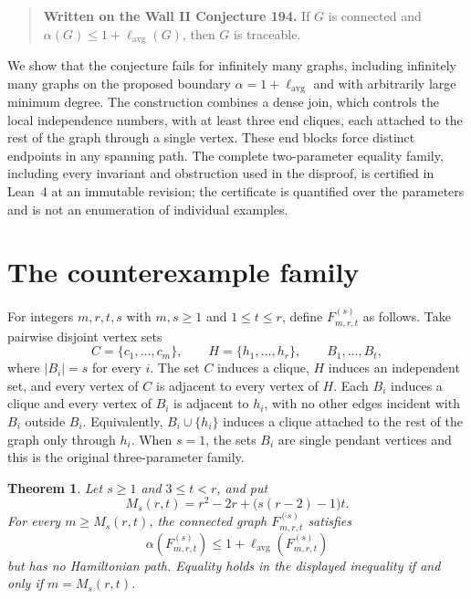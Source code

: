\documentclass[11pt]{article}
\newtheorem{theorem}{Theorem}
\newcommand{\lavg}{\ell_{\mathrm{avg}}}
\begin{document}
\begin{quote}
\textbf{Written on the Wall II Conjecture 194.}
If $G$ is connected and $\alpha(G)\leq 1+\lavg(G)$, then $G$ is traceable.
\end{quote}

We show that the conjecture fails for infinitely many graphs, including infinitely many
graphs on the proposed boundary $\alpha=1+\lavg$ and with arbitrarily large minimum degree.
The construction combines a dense join, which controls the local independence numbers, with
at least three end cliques, each attached to the rest of the graph through a single vertex.
These end blocks force distinct endpoints in any spanning path.  The complete two-parameter
equality family, including every invariant and obstruction used in the disproof, is certified
in Lean~4 at an immutable revision; the certificate is quantified over the parameters and is
not an enumeration of individual examples.

\section{The counterexample family}

For integers $m,r,t,s$ with $m,s\geq 1$ and $1\leq t\leq r$, define
$F^{(s)}_{m,r,t}$ as follows.  Take pairwise disjoint vertex sets
\[
  C=\{c_1,\dots,c_m\},\qquad
  H=\{h_1,\dots,h_r\},\qquad
  B_1,\dots,B_t,
\]
where $|B_i|=s$ for every $i$.
The set $C$ induces a clique, $H$ induces an independent set, and every vertex of $C$ is
adjacent to every vertex of $H$.  Each $B_i$ induces a clique and every vertex of $B_i$
is adjacent to $h_i$, with no other edges incident with $B_i$ outside $B_i$.  Equivalently,
$B_i\cup\{h_i\}$ induces a clique attached to the rest of the graph only through $h_i$.
When $s=1$, the sets $B_i$ are single pendant vertices and this is the original
three-parameter family.

\begin{theorem}\label{thm:family}
Let $s\geq 1$ and $3\leq t<r$, and put
\[
  M_s(r,t)=r^2-2r+\bigl(s(r-2)-1\bigr)t.
\]
For every $m\geq M_s(r,t)$, the connected graph $F^{(s)}_{m,r,t}$ satisfies
\[
  \alpha(F^{(s)}_{m,r,t})\leq 1+\lavg(F^{(s)}_{m,r,t})
\]
but has no Hamiltonian path.  Equality holds in the displayed inequality if and only if
$m=M_s(r,t)$.
\end{theorem}
\end{document}
